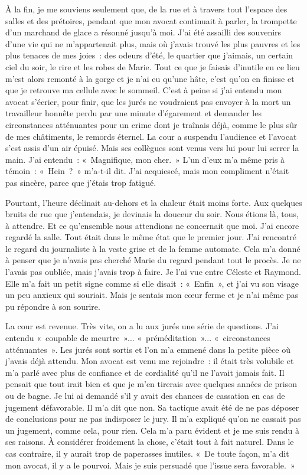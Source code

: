 \documentclass[french,twoside]{book} %
\begin{document}
À la fin, je me souviens seulement que, de la rue et à travers tout l’espace des salles et des prétoires, pendant que mon avocat continuait à parler, la trompette d’un marchand de glace a résonné jusqu’à moi. J'ai été assailli des souvenirs d’une vie qui ne m’appartenait plus, mais où j’avais trouvé les plus pauvres et les plus tenaces de mes joies : des odeurs d’été, le quartier que j’aimais, un certain ciel du soir, le rire et les robes de Marie. Tout ce que je faisais d’inutile en ce lieu m’est alors remonté à la gorge et je n’ai eu qu’une hâte, c’est qu’on en finisse et que je retrouve ma cellule avec le sommeil. C'est à peine si j’ai entendu mon avocat s’écrier, pour finir, que les jurés ne voudraient pas envoyer à la mort un travailleur honnête perdu par une minute d’égarement et demander les circonstances atténuantes pour un crime dont je traînais déjà, comme le plus sûr de mes châtiments, le remords éternel. La cour a suspendu l’audience et l’avocat s’est assis d’un air épuisé. Mais ses collègues sont venus vers lui pour lui serrer la main. J'ai entendu : « Magnifique, mon cher. » L'un d’eux m’a même pris à témoin : « Hein ? » m’a-t-il dit. J'ai acquiescé, mais mon compliment n’était pas sincère, parce que j’étais trop fatigué.\par
Pourtant, l’heure déclinait au-dehors et la chaleur était moins forte. Aux quelques bruits de rue que j’entendais, je devinais la douceur du soir. Nous étions là, tous, à attendre. Et ce qu’ensemble nous attendions ne concernait que moi. J'ai encore regardé la salle. Tout était dans le même état que le premier jour. J'ai rencontré le regard du journaliste à la veste grise et de la femme automate. Cela m’a donné à penser que je n’avais pas cherché Marie du regard pendant tout le procès. Je ne l’avais pas oubliée, mais j’avais trop à faire. Je l’ai vue entre Céleste et Raymond. Elle m’a fait un petit signe comme si elle disait : « Enfin », et j’ai vu son visage un peu anxieux qui souriait. Mais je sentais mon cœur ferme et je n’ai même pas pu répondre à son sourire.\par
La cour est revenue. Très vite, on a lu aux jurés une série de questions. J'ai entendu « coupable de meurtre »... « préméditation »... « circonstances atténuantes ». Les jurés sont sortis et l’on m’a emmené dans la petite pièce où j’avais déjà attendu. Mon avocat est venu me rejoindre : il était très volubile et m’a parlé avec plus de confiance et de cordialité qu’il ne l’avait jamais fait. Il pensait que tout irait bien et que je m’en tirerais avec quelques années de prison ou de bagne. Je lui ai demandé s’il y avait des chances de cassation en cas de jugement défavorable. Il m’a dit que non. Sa tactique avait été de ne pas déposer de conclusions pour ne pas indisposer le jury. Il m’a expliqué qu’on ne cassait pas un jugement, comme cela, pour rien. Cela m’a paru évident et je me suis rendu à ses raisons. À considérer froidement la chose, c’était tout à fait naturel. Dans le cas contraire, il y aurait trop de paperasses inutiles. « De toute façon, m’a dit mon avocat, il y a le pourvoi. Mais je suis persuadé que l’issue sera favorable. »\par
\end{document}
